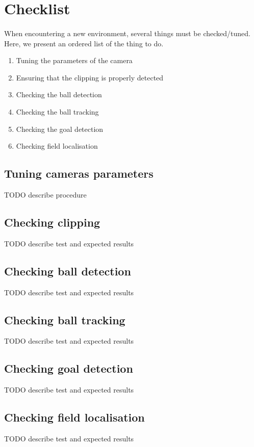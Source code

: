 \documentclass[a4paper,12pt]{article}
\begin{document}
\section{Checklist}

\paragraph{}
When encountering a new environment, several things must be checked/tuned. Here,
we present an ordered list of the thing to do.

\begin{enumerate}
\item Tuning the parameters of the camera
\item Ensuring that the clipping is properly detected
\item Checking the ball detection
\item Checking the ball tracking
\item Checking the goal detection
\item Checking field localisation
\end{enumerate}

\subsection{Tuning cameras parameters}
TODO describe procedure
\subsection{Checking clipping}
TODO describe test and expected results
\subsection{Checking ball detection}
TODO describe test and expected results
\subsection{Checking ball tracking}
TODO describe test and expected results
\subsection{Checking goal detection}
TODO describe test and expected results
\subsection{Checking field localisation}
TODO describe test and expected results
\end{document}
